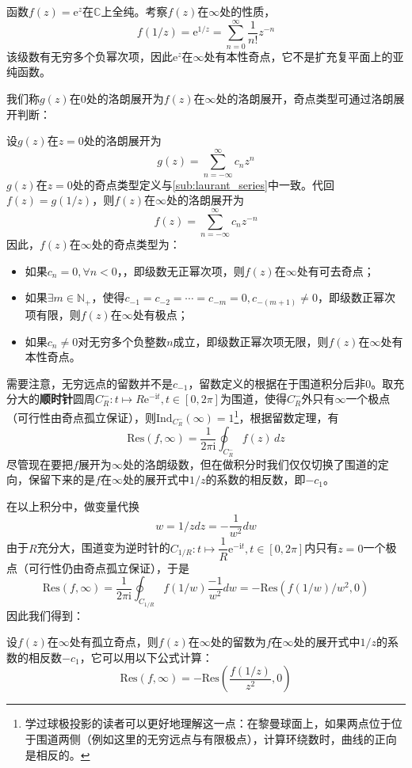 \documentclass{ctexbook}
\begin{document}
\begin{example}
    函数$f(z)=\mathrm{e}^{z}$在$\mathbb{C}$上全纯。考察$f(z)$在$\infty$处的性质，
    \[f(1/z)=\mathrm{e}^{1/z}=\sum_{n=0}^{\infty}\frac{1}{n!}z^{-n}\]
    该级数有无穷多个负幂次项，因此$\mathrm{e}^{z}$在$\infty$处有本性奇点，它不是扩充复平面上的亚纯函数。
\end{example}

我们称$g(z)$在$0$处的洛朗展开为$f(z)$在$\infty$处的洛朗展开，奇点类型可通过洛朗展开判断：
\begin{definition}[无穷远点的洛朗展开与奇点类型]
    设$g(z)$在$z=0$处的洛朗展开为
    \[g(z)=\sum_{n=-\infty}^{\infty}c_n z^{n}\]
    $g(z)$在$z=0$处的奇点类型定义与\ref{sub:laurant_series}中一致。代回$f(z)=g(1/z)$，则$f(z)$在$\infty$处的洛朗展开为
    \[f(z)=\sum_{n=-\infty}^{\infty}c_n z^{-n}\]
    因此，$f(z)$在$\infty$处的奇点类型为：
    \begin{itemize}
        \item 如果$c_n=0,\forall n<0$，，即级数无正幂次项，则$f(z)$在$\infty$处有可去奇点；
        \item 如果$\exists m\in\mathbb{N}_+$，使得$c_{-1}=c_{-2}=\cdots =c_{-m}=0,c_{-(m+1)}\neq 0$，即级数正幂次项有限，则$f(z)$在$\infty$处有极点；
        \item 如果$c_n\neq 0$对无穷多个负整数$n$成立，即级数正幂次项无限，则$f(z)$在$\infty$处有本性奇点。
    \end{itemize}
\end{definition}

需要注意，无穷远点的留数并不是$c_{-1}$，留数定义的根据在于围道积分后非0。取充分大的\textbf{顺时针}圆周$C^-_R:t\mapsto R\mathrm{e}^{-\mathrm{i}t},t\in[0,2\pi]$为围道，使得$C^-_R$外只有$\infty$一个极点（可行性由奇点孤立保证），则$\text{Ind}_{C^-_R}(\infty)=1$\footnote{学过球极投影的读者可以更好地理解这一点：在黎曼球面上，如果两点位于位于围道两侧（例如这里的无穷远点与有限极点），计算环绕数时，曲线的正向是相反的。}，根据留数定理，有
$$\text{Res}(f,\infty)=\dfrac{1}{2\pi \mathrm{i}}\oint_{C^-_R}f(z)\,dz$$
尽管现在要把$f$展开为$\infty$处的洛朗级数，但在做积分时我们仅仅切换了围道的定向，保留下来的是$f$在$\infty$处的展开式中$1/z$的系数的相反数，即$-c_{1}$。

在以上积分中，做变量代换$$w=1/zdz=-\dfrac{1}{w^2}dw$$
由于$R$充分大，围道变为逆时针的$C_{1/R}:t\mapsto \dfrac{1}{R}\mathrm{e}^{-\mathrm{i}t},t\in[0,2\pi]$内只有$z=0$一个极点（可行性仍由奇点孤立保证），于是
\[\text{Res}(f,\infty)=\frac{1}{2\pi \mathrm{i}}\oint_{C_{1/R}}f(1/w)\frac{-1}{w^2}dw=-\text{Res}\left(f(1/w)/w^2,0\right)\]
因此我们得到：
\begin{proposition}[无穷远点的留数]
    设$f(z)$在$\infty$处有孤立奇点，则$f(z)$在$\infty$处的留数为$f$在$\infty$处的展开式中$1/z$的系数的相反数$-c_{1}$，它可以用以下公式计算：
    \[\text{Res}(f,\infty)=-\text{Res}\left(\frac{f(1/z)}{z^2},0\right)\]
\end{proposition}
\end{document}
